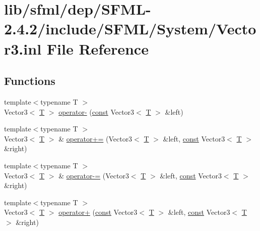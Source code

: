 \hypertarget{sfml_2dep_2_s_f_m_l-2_84_82_2include_2_s_f_m_l_2_system_2_vector3_8inl}{\section{lib/sfml/dep/\-S\-F\-M\-L-\/2.4.2/include/\-S\-F\-M\-L/\-System/\-Vector3.inl File Reference}
\label{sfml_2dep_2_s_f_m_l-2_84_82_2include_2_s_f_m_l_2_system_2_vector3_8inl}
}
\subsection*{Functions}
\begin{DoxyCompactItemize}
\item 
{\footnotesize template$<$typename T $>$ }\\Vector3$<$ \hyperlink{curses_8priv_8h_a5ef253115820acf7d27f3c5c3b02a0f0}{T} $>$ \hyperlink{sfml_2dep_2_s_f_m_l-2_84_82_2include_2_s_f_m_l_2_system_2_vector3_8inl_a14eae4e552fcf9fdc317d612be92dbfe}{operator-\/} (\hyperlink{term__entry_8h_a57bd63ce7f9a353488880e3de6692d5a}{const} Vector3$<$ \hyperlink{curses_8priv_8h_a5ef253115820acf7d27f3c5c3b02a0f0}{T} $>$ \&left)
\item 
{\footnotesize template$<$typename T $>$ }\\Vector3$<$ \hyperlink{curses_8priv_8h_a5ef253115820acf7d27f3c5c3b02a0f0}{T} $>$ \& \hyperlink{sfml_2dep_2_s_f_m_l-2_84_82_2include_2_s_f_m_l_2_system_2_vector3_8inl_a0d2cd514825e2d2c50271684a9356c16}{operator+=} (Vector3$<$ \hyperlink{curses_8priv_8h_a5ef253115820acf7d27f3c5c3b02a0f0}{T} $>$ \&left, \hyperlink{term__entry_8h_a57bd63ce7f9a353488880e3de6692d5a}{const} Vector3$<$ \hyperlink{curses_8priv_8h_a5ef253115820acf7d27f3c5c3b02a0f0}{T} $>$ \&right)
\item 
{\footnotesize template$<$typename T $>$ }\\Vector3$<$ \hyperlink{curses_8priv_8h_a5ef253115820acf7d27f3c5c3b02a0f0}{T} $>$ \& \hyperlink{sfml_2dep_2_s_f_m_l-2_84_82_2include_2_s_f_m_l_2_system_2_vector3_8inl_a9d5c48185baa729118053f6512d94a9c}{operator-\/=} (Vector3$<$ \hyperlink{curses_8priv_8h_a5ef253115820acf7d27f3c5c3b02a0f0}{T} $>$ \&left, \hyperlink{term__entry_8h_a57bd63ce7f9a353488880e3de6692d5a}{const} Vector3$<$ \hyperlink{curses_8priv_8h_a5ef253115820acf7d27f3c5c3b02a0f0}{T} $>$ \&right)
\item 
{\footnotesize template$<$typename T $>$ }\\Vector3$<$ \hyperlink{curses_8priv_8h_a5ef253115820acf7d27f3c5c3b02a0f0}{T} $>$ \hyperlink{sfml_2dep_2_s_f_m_l-2_84_82_2include_2_s_f_m_l_2_system_2_vector3_8inl_aa57b1433e51c98ce9389ce02916f19c2}{operator+} (\hyperlink{term__entry_8h_a57bd63ce7f9a353488880e3de6692d5a}{const} Vector3$<$ \hyperlink{curses_8priv_8h_a5ef253115820acf7d27f3c5c3b02a0f0}{T} $>$ \&left, \hyperlink{term__entry_8h_a57bd63ce7f9a353488880e3de6692d5a}{const} Vector3$<$ \hyperlink{curses_8priv_8h_a5ef253115820acf7d27f3c5c3b02a0f0}{T} $>$ \&right)

\end{DoxyCompactItemize}
